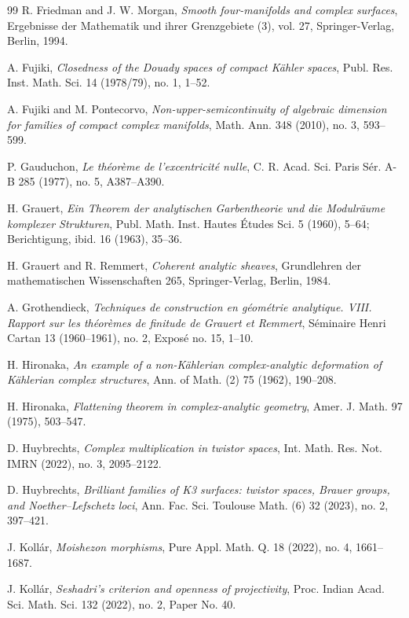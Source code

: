 \documentclass[11pt]{amsart}
\numberwithin{equation}{section}
\theoremstyle{plain}
\theoremstyle{definition}
\begin{document}
\begin{thebibliography}{99}
R. Friedman and J. W. Morgan,
\textit{Smooth four-manifolds and complex surfaces},
Ergebnisse der Mathematik und ihrer Grenzgebiete (3), vol. 27,
Springer-Verlag, Berlin, 1994.

A. Fujiki,
\textit{Closedness of the Douady spaces of compact K\"ahler spaces},
Publ. Res. Inst. Math. Sci. 14 (1978/79), no. 1, 1--52.

A. Fujiki and M. Pontecorvo,
\textit{Non-upper-semicontinuity of algebraic dimension for families of
compact complex manifolds},
Math. Ann. 348 (2010), no. 3, 593--599.

P. Gauduchon,
\textit{Le th\'eor\`eme de l'excentricit\'e nulle},
C. R. Acad. Sci. Paris S\'er. A-B 285 (1977), no. 5, A387--A390.


H. Grauert,
\textit{Ein Theorem der analytischen Garbentheorie und die Modulr\"aume
komplexer Strukturen},
Publ. Math. Inst. Hautes \'Etudes Sci. 5 (1960), 5--64;
Berichtigung, ibid. 16 (1963), 35--36.

H. Grauert and R. Remmert,
\textit{Coherent analytic sheaves},
Grundlehren der mathematischen Wissenschaften 265,
Springer-Verlag, Berlin, 1984.


A. Grothendieck,
\textit{Techniques de construction en g\'eom\'etrie analytique. VIII.
Rapport sur les th\'eor\`emes de finitude de Grauert et Remmert},
S\'eminaire Henri Cartan 13 (1960--1961), no. 2, Expos\'e no. 15, 1--10.

H. Hironaka,
\textit{An example of a non-K\"ahlerian complex-analytic deformation of
K\"ahlerian complex structures},
Ann. of Math. (2) 75 (1962), 190--208.

H. Hironaka,
\textit{Flattening theorem in complex-analytic geometry},
Amer. J. Math. 97 (1975), 503--547.

D. Huybrechts,
\textit{Complex multiplication in twistor spaces},
Int. Math. Res. Not. IMRN (2022), no. 3, 2095--2122.

D. Huybrechts,
\textit{Brilliant families of K3 surfaces: twistor spaces, Brauer groups,
and Noether--Lefschetz loci},
Ann. Fac. Sci. Toulouse Math. (6) 32 (2023), no. 2, 397--421.

J. Koll\'ar,
\textit{Moishezon morphisms},
Pure Appl. Math. Q. 18 (2022), no. 4, 1661--1687.

J. Koll\'ar,
\textit{Seshadri's criterion and openness of projectivity},
Proc. Indian Acad. Sci. Math. Sci. 132 (2022), no. 2, Paper No. 40.


\end{thebibliography}
\end{document}
